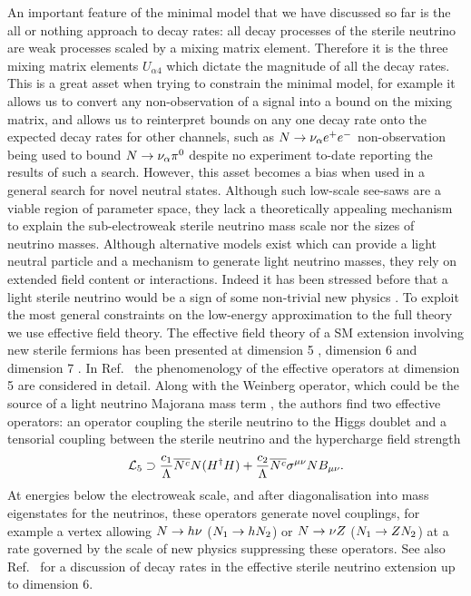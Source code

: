 \documentclass[11pt, a4paper]{article}
\newcommand{\refref}[1]{Ref.~\cite{#1}}
\def\ster{\ensuremath N}
\begin{document}
An important feature of the minimal model that we have discussed so far is the
all or nothing approach to decay rates: all decay processes of the sterile
neutrino are weak processes scaled by a mixing matrix element. 
%
Therefore it is the three mixing matrix elements $U_{\alpha 4}$ which dictate
the magnitude of all the decay rates. This is a great asset when trying to
constrain the  minimal model, for example it allows us to convert any
non-observation of a signal into a bound on the mixing matrix, and allows us to
reinterpret bounds on any one decay rate onto the expected decay rates for
other channels, such as $\ster \rightarrow \nu_\alpha e^+ e^-$ non-observation
being used to bound $\ster \rightarrow \nu_\alpha \pi^0$ despite no experiment
to-date reporting the results of such a search. 
%
However, this asset becomes a bias when used in a general search for novel
neutral states. Although such low-scale see-saws are a viable region of
parameter space, they lack a theoretically appealing mechanism to explain the
sub-electroweak sterile neutrino mass scale nor the sizes of neutrino masses.
Although alternative models exist which can provide a light neutral particle
and a mechanism to generate light neutrino masses, they rely on extended field
content or interactions.
%
Indeed it has been stressed before that a light sterile neutrino would be a
sign of some non-trivial new physics \cite{delAguila:2008ir}. To exploit the
most general constraints on the low-energy approximation to the full theory we
use effective field theory. The effective field theory of a SM extension
involving new sterile fermions has been presented at dimension 5
\cite{delAguila:2008ir,Aparici:2009fh}, dimension 6 \cite{delAguila:2008ir} and
dimension 7 \cite{Bhattacharya:2015vja}.
%
In \refref{Aparici:2009fh} the phenomenology of the effective operators at
dimension 5 are considered in detail. Along with the Weinberg operator, which
could be the source of a light neutrino Majorana mass term
\cite{Weinberg:1979sa}, the authors find two effective operators: an operator
coupling the sterile neutrino to the Higgs doublet and a tensorial coupling
between the sterile neutrino and the hypercharge field strength 
%
\[ \mathcal{L}_5 \supset \frac{c_1}{\Lambda}\overline{\ster^c}\ster(H^\dagger H) +
\frac{c_2}{\Lambda}\overline{\ster^c}\sigma^{\mu\nu}\ster B_{\mu\nu}. \] 
%
At energies below the electroweak scale, and after diagonalisation into mass
eigenstates for the neutrinos, these operators generate novel couplings, for
example a vertex allowing $\ster\to h \nu$ ($\ster_1\to h \ster_2$) or $\ster\to \nu Z$
($\ster_1\to Z \ster_2$) at a rate governed by the scale of new physics suppressing
these operators. See also \refref{Duarte:2016miz} for a discussion of decay
rates in the effective sterile neutrino extension up to dimension 6.
\end{document}
